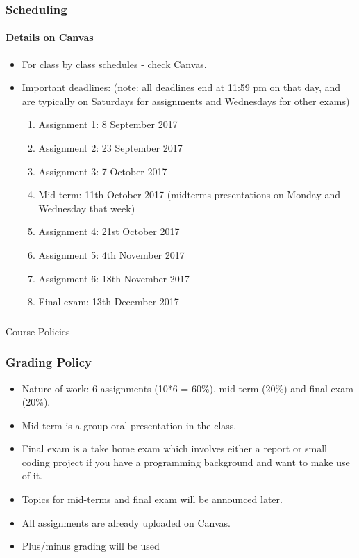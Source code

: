 \documentclass{beamer}
\begin{document}
\begin{frame}
\frametitle{Scheduling}
\framesubtitle{Details on Canvas}
\begin{itemize} 
\item For class by class schedules - check Canvas. 
\item Important deadlines:
(note: all deadlines end at 11:59 pm on that day, and are typically on Saturdays for assignments and Wednesdays for other exams)
\begin{enumerate}
\item Assignment 1: 8 September 2017
\item Assignment 2: 23 September 2017
\item Assignment 3: 7 October 2017
\item Mid-term: 11th October 2017 (midterms presentations on Monday and Wednesday that week)
\item Assignment 4: 21st October 2017
\item Assignment 5: 4th November 2017
\item Assignment 6: 18th November 2017
\item Final exam: 13th December 2017
\end{enumerate}
\end{itemize}
\end{frame}

\begin{frame}
\frametitle{}
\begin{center}
\Large Course Policies
\end{center}
\end{frame}

\begin{frame}
\frametitle{Grading Policy}
\begin{itemize}
\item Nature of work: 6 assignments (10*6 = 60\%), mid-term (20\%) and final exam (20\%).
\item Mid-term is a group oral presentation in the class.
\item Final exam is a take home exam which involves either a report or small coding project if you have a programming background and want to make use of it.
\item Topics for mid-terms and final exam will be announced later.
\item All assignments are already uploaded on Canvas.
\item Plus/minus grading will be used
\end{itemize}
\end{frame}
\end{document}
